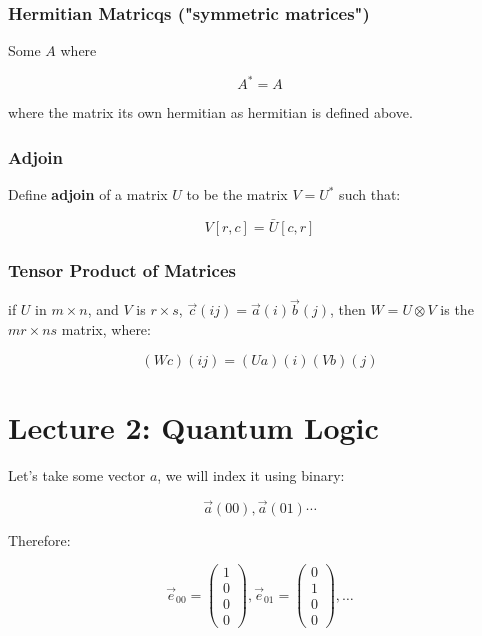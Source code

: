 \documentclass[letterpaper]{article}
\begin{document}
\subsubsection{Hermitian Matricqs ("symmetric matrices")}
\label{sec:org2f97f7e}
Some \(A\) where

\begin{equation}
A^* = A    
\end{equation}

where the matrix its own hermitian as hermitian is defined above.

\subsubsection{Adjoin}
\label{sec:org17847af}
Define \textbf{adjoin} of a matrix \(U\) to be the matrix \(V = U^*\) such that:

\begin{equation}
   V[r,c] = \bar{U}[c,r] 
\end{equation}

\subsubsection{Tensor Product of Matrices}
\label{sec:org411c2fd}
if \(U\) in \(m\times n\), and \(V\) is \(r \times s\), \(\vec{c}(ij) = \vec{a}(i)\vec{b}(j)\), then \(W = U \otimes V\) is the \(mr \times ns\) matrix, where:

\begin{equation}
   (Wc)(ij) = (Ua)(i)(Vb)(j)
\end{equation}


\section{Lecture 2: Quantum Logic}
\label{sec:org563965a}
Let's take some vector \(a\), we will index it using binary:

\begin{equation}
   \vec{a}(00), \vec{a}(01) \cdots
\end{equation}

Therefore:

\begin{equation}
  \vec{e}_{00} = \begin{pmatrix}
1 \\ 0 \\0 \\ 0 \end{pmatrix}, \vec{e}_{01} = \begin{pmatrix}
0 \\ 1 \\0 \\ 0 \end{pmatrix}, \ldots
\end{equation}
\end{document}
